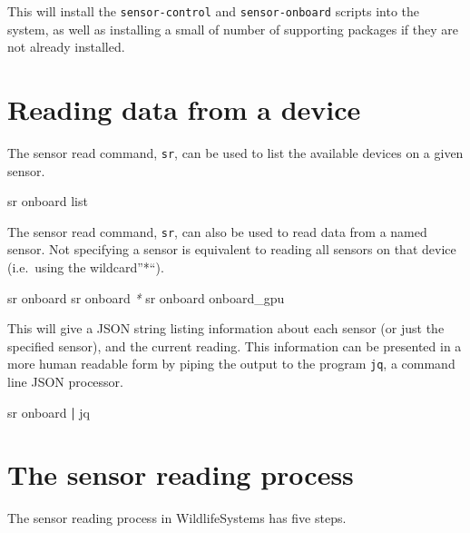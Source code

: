 \documentclass[
]{book}
\newenvironment{Shaded}{\begin{snugshade}}{\end{snugshade}}
\newcommand{\ExtensionTok}[1]{#1}
\newcommand{\KeywordTok}[1]{\textcolor[rgb]{0.13,0.29,0.53}{\textbf{#1}}}
\newcommand{\NormalTok}[1]{#1}
\newcommand{\PreprocessorTok}[1]{\textcolor[rgb]{0.56,0.35,0.01}{\textit{#1}}}
\begin{document}
This will install the \texttt{sensor-control} and \texttt{sensor-onboard} scripts into the system, as well as installing a small of number of supporting packages if they are not already installed.

\section{Reading data from a device}\label{reading-data-from-a-device}

The sensor read command, \texttt{sr}, can be used to list the available devices on a given sensor.

\begin{Shaded}
\begin{Highlighting}[]
\ExtensionTok{sr}\NormalTok{ onboard list}
\end{Highlighting}
\end{Shaded}

The sensor read command, \texttt{sr}, can also be used to read data from a named sensor. Not specifying a sensor is equivalent to reading all sensors on that device (i.e.~using the wildcard''*``).

\begin{Shaded}
\begin{Highlighting}[]
\ExtensionTok{sr}\NormalTok{ onboard}
\ExtensionTok{sr}\NormalTok{ onboard }\PreprocessorTok{*}
\ExtensionTok{sr}\NormalTok{ onboard onboard\_gpu}
\end{Highlighting}
\end{Shaded}

This will give a JSON string listing information about each sensor (or just the specified sensor), and the current reading. This information can be presented in a more human readable form by piping the output to the program \texttt{jq}, a command line JSON processor.

\begin{Shaded}
\begin{Highlighting}[]
\ExtensionTok{sr}\NormalTok{ onboard }\KeywordTok{|} \ExtensionTok{jq}
\end{Highlighting}
\end{Shaded}

\section{The sensor reading process}\label{the-sensor-reading-process}

The sensor reading process in WildlifeSystems has five steps.
\end{document}
